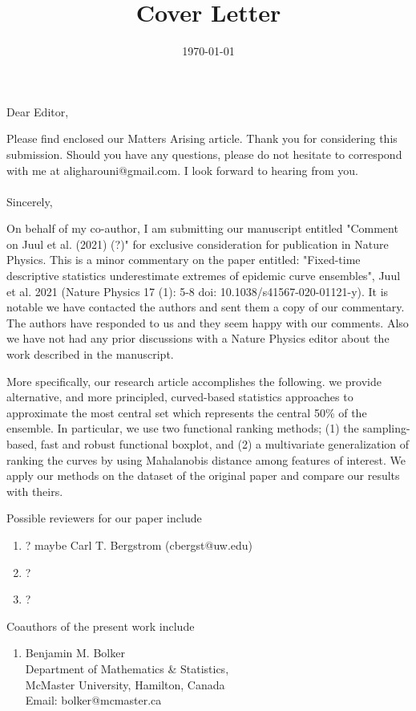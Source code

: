 \documentclass[10pt,a4paper,roman]{moderncv}
\title{Cover Letter}
\begin{document}
\recipient{\leavevmode}{ }

\date{\today}
\opening{Dear Editor,}

\closing{Please find enclosed our Matters Arising article. Thank you for considering this submission. Should you have any questions, please do not hesitate to correspond with me at aligharouni@gmail.com. I look forward to hearing from you.\\
\leavevmode
\\
Sincerely,}
\makelettertitle

On behalf of my co-author, I am submitting our manuscript entitled "Comment on Juul et al. (2021) (?)" for exclusive consideration for publication in Nature Physics. This is a minor commentary on the paper entitled: "Fixed-time descriptive statistics underestimate extremes of epidemic curve ensembles", Juul et al. 2021 (Nature Physics 17 (1): 5-8 doi: 10.1038/s41567-020-01121-y). It is notable we have contacted the authors and sent them a copy of our commentary. The authors have responded to us and they seem happy with our comments. Also we have not had any prior discussions with a Nature Physics editor about the work described in the manuscript. 

More specifically, our research article accomplishes the following.
we provide alternative, and more principled, curved-based statistics approaches to approximate the most central set which represents the central 50\% of the ensemble. In particular, we use two functional ranking methods; (1) the sampling-based, fast and robust functional boxplot, and (2) a multivariate generalization of ranking the curves by using Mahalanobis distance among features of interest. We apply our methods on the dataset of the original paper and compare our results with theirs.

Possible reviewers for our paper include
\begin{enumerate}
\item ? maybe Carl T. Bergstrom (cbergst@uw.edu)
\item ?
\item ?
\end{enumerate}

Coauthors of the present work include
\begin{enumerate}
\item Benjamin M. Bolker \\
Department of Mathematics \& Statistics,\\
McMaster University, Hamilton, Canada\\
Email: bolker@mcmaster.ca
\end{enumerate}

\vspace{0.5cm}

\makeletterclosing
\end{document}

